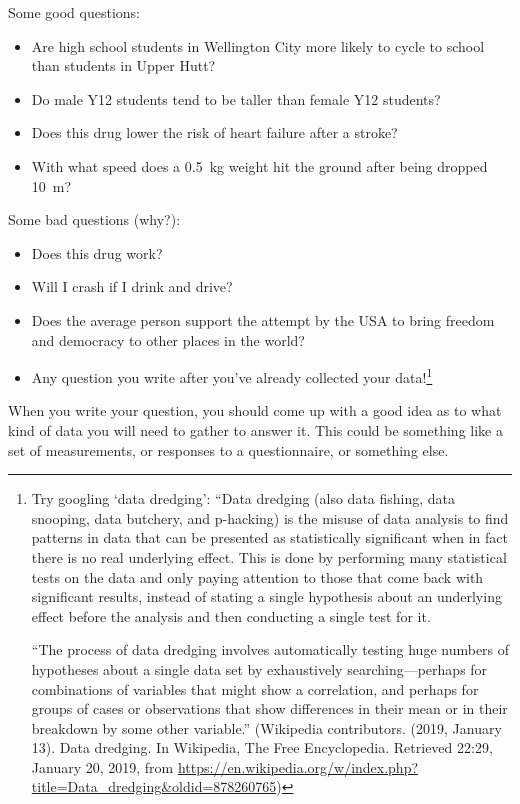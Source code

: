 Some good questions:
\begin{itemize}
  \item Are high school students in Wellington City more likely to cycle to school than students in Upper Hutt?
  \item Do male Y12 students tend to be taller than female Y12 students?
  \item Does this drug lower the risk of heart failure after a stroke?
  \item With what speed does a \SI{0.5}{\kilo\gram} weight hit the ground after being dropped \SI{10}{\metre}?
\end{itemize}

Some bad questions (why?):
\begin{itemize}
  \item Does this drug work?
  \item Will I crash if I drink and drive?
  \item Does the average person support the attempt by the USA to bring freedom and democracy to other places in the world?
  \item Any question you write after you've already collected your data!\footnote{Try googling `data dredging': ``Data dredging (also data fishing, data snooping,
        data butchery, and p-hacking) is the misuse of data analysis to find patterns in data that can be presented as statistically significant when in fact there
        is no real underlying effect. This is done by performing many statistical tests on the data and only paying attention to those that come back with
        significant results, instead of stating a single hypothesis about an underlying effect before the analysis and then conducting a single test for it.

        ``The process of data dredging involves automatically testing huge numbers of hypotheses about a single data set by exhaustively searching—perhaps for
        combinations of variables that might show a correlation, and perhaps for groups of cases or observations that show differences in their mean or in
        their breakdown by some other variable.'' (Wikipedia contributors. (2019, January 13). Data dredging. In Wikipedia, The Free Encyclopedia. Retrieved 22:29, January 20, 2019, from \url{https://en.wikipedia.org/w/index.php?title=Data_dredging&oldid=878260765})}
\end{itemize}

When you write your question, you should come up with a good idea as to what kind of data you will need to gather to answer it. This could
be something like a set of measurements, or responses to a questionnaire, or something else.

